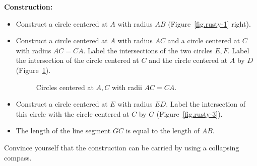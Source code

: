 \textbf{Construction:}
\begin{itemize}
\item Construct a circle centered at $A$ with radius $AB$ (Figure~\ref{fig.rusty-1} right).
\item Construct a circle centered at $A$ with radius $AC$ and a circle centered at $C$ with radius $AC=CA$. Label the intersections of the two circles $E,F$. Label the intersection of the circle centered at $C$ and the circle centered at $A$ by $D$ (Figure~\ref{fig.rusty-2}).
\begin{figure}[H]	
\begin{center}
\caption{Circles centered at $A,C$ with radii $AC=CA$.}\label{fig.rusty-2}
\end{center}
\end{figure}
\vspace*{-5ex}
\item Construct a circle centered at $E$ with radius $ED$. Label the intersection of this circle with the circle centered at $C$ by $G$ (Figure~\ref{fig.rusty-3}).
\item The length of the line segment $GC$ is equal to the length of $AB$.
\end{itemize}
Convince yourself that the construction can be carried by using a collapsing compass.

